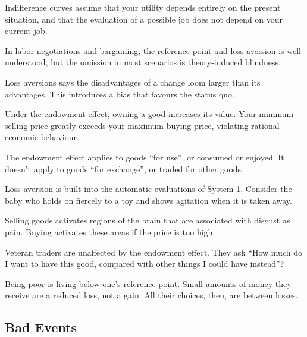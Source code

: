 \bit
\item Indifference curves assume that your utility depends entirely on the present situation, and that the evaluation
of a possible job does not depend on your current job.
\item In labor negotiations and bargaining, the reference point and loss aversion is well understood, but the
omission in most scenarios is theory-induced blindness.
\item Loss aversions says the disadvantages of a change loom larger than its advantages. This introduces a bias that
favours the status quo.
\item Under the endowment effect, owning a good increases its value. Your minimum selling price greatly exceeds your
maximum buying price, violating rational economic behaviour.
\item The endowment effect applies to goods ``for use'', or consumed or enjoyed. It doesn't apply to goods ``for
exchange'', or traded for other goods.
\item Loss aversion is built into the automatic evaluations of System 1. Consider the baby who holds on fiercely to a
toy and shows agitation when it is taken away.
\item Selling goods activates regions of the brain that are associated with disgust as pain. Buying activates these
areas if the price is too high.
\item Veteran traders are unaffected by the endowment effect. They ask ``How much do I want to have this good,
compared with other things I could have instead''?
\item Being poor is living below one's reference point. Small amounts of money they receive are a reduced loss, not a
gain. All their choices, then, are between losses.
\eit

\subsection*{Bad Events}

